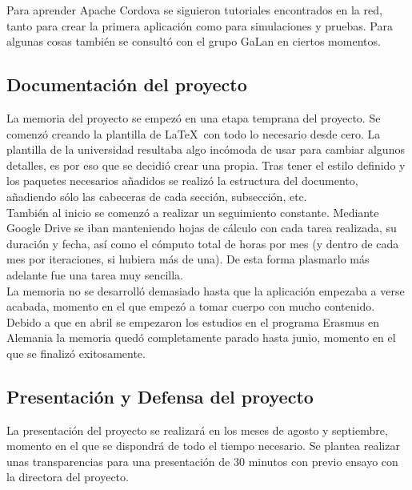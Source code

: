 Para aprender Apache Cordova se siguieron tutoriales encontrados en la red, tanto para crear la primera aplicación como para simulaciones y pruebas. Para algunas cosas también se consultó con el grupo GaLan en ciertos momentos.\\

\subsection{Documentación del proyecto}

La memoria del proyecto se empezó en una etapa temprana del proyecto. Se comenzó creando la plantilla de \LaTeX \ con todo lo necesario desde cero. La plantilla de la universidad resultaba algo incómoda de usar para cambiar algunos detalles, es por eso que se decidió crear una propia. Tras tener el estilo definido y los paquetes necesarios añadidos se realizó la estructura del documento, añadiendo sólo las cabeceras de cada sección, subsección, etc.\\

También al inicio se comenzó a realizar un seguimiento constante. Mediante Google Drive se iban manteniendo hojas de cálculo con cada tarea realizada, su duración y fecha, así como el cómputo total de horas por mes (y dentro de cada mes por iteraciones, si hubiera más de una). De esta forma plasmarlo más adelante fue una tarea muy sencilla.\\

La memoria no se desarrolló demasiado hasta que la aplicación empezaba a verse acabada, momento en el que empezó a tomar cuerpo con mucho contenido. Debido a que en abril se empezaron los estudios en el programa Erasmus en Alemania la memoria quedó completamente parado hasta junio, momento en el que se finalizó exitosamente.\\

\subsection{Presentación y Defensa del proyecto}

La presentación del proyecto se realizará en los meses de agosto y septiembre, momento en el que se dispondrá de todo el tiempo necesario. Se plantea realizar unas transparencias para una presentación de 30 minutos con previo ensayo con la directora del proyecto.\\


